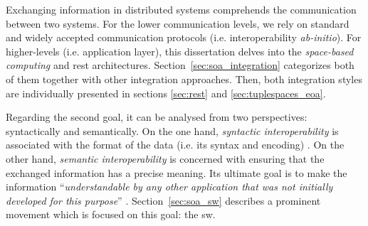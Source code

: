 Exchanging information in distributed systems comprehends the communication between two systems.
For the lower communication levels, we rely on standard and widely accepted communication protocols (i.e. interoperability \emph{ab-initio}). %
For higher-levels (i.e. application layer), this dissertation delves into the \emph{space-based computing} and \ac{rest} architectures.
Section~\ref{sec:soa_integration} categorizes both of them together with other integration approaches.
Then, both integration styles are individually presented in sections \ref{sec:rest} and \ref{sec:tuplespaces_eoa}.

\medskip

Regarding the second goal, it can be analysed from two perspectives: syntactically and semantically.
On the one hand, \emph{syntactic interoperability} is associated with the format of the data (i.e. its syntax and encoding) \citep{van_der_veer_achieving_2006}. %
On the other hand, \emph{semantic interoperability} is concerned with ensuring that the exchanged information has a precise meaning.
Its ultimate goal is to make the information ``\emph{understandable by any other application that was not initially developed for this purpose}'' \citep{_european_2004}.
Section~\ref{sec:soa_sw} describes a prominent movement which is focused on this goal: the \acl{sw}. %










